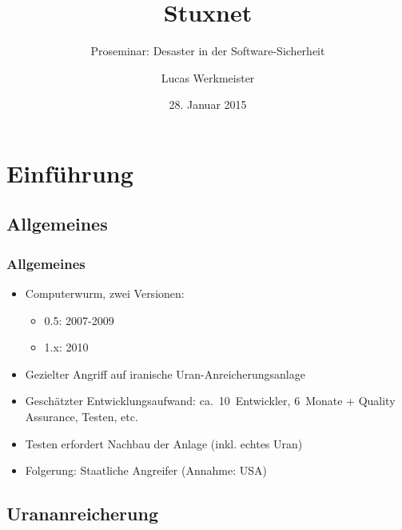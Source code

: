 \documentclass{beamer}
\title{Stuxnet}
\subtitle{Proseminar: Desaster in der Software-Sicherheit}
\author{Lucas Werkmeister}
\date{28. Januar 2015}
\begin{document}
\begin{frame}
  \titlepage
\end{frame}


\section{Einführung}

\subsection{Allgemeines}

\begin{frame}
  \frametitle{Allgemeines}
  \begin{itemize}
    \item Computerwurm, zwei Versionen:
      \begin{itemize}
        \item 0.5: 2007-2009
        \item 1.x: 2010
      \end{itemize}
    \item Gezielter Angriff auf iranische Uran-Anreicherungsanlage
    \item Geschätzter Entwicklungsaufwand: ca.~10~Entwickler, 6~Monate + Quality Assurance, Testen, etc.
    \item Testen erfordert Nachbau der Anlage (inkl. echtes Uran)
    \item Folgerung: Staatliche Angreifer (Annahme: USA)
  \end{itemize}
\end{frame}

\subsection{Urananreicherung}
\end{document}
